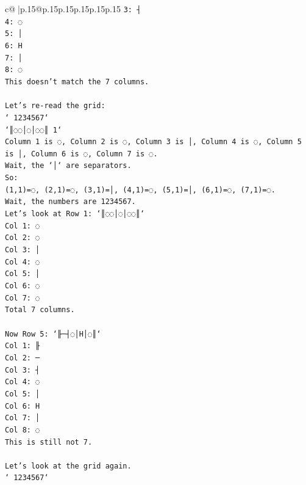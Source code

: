 \documentclass{article}
\begin{document}
{\begin{supertabular}{c@{$\;$}|p{.15\linewidth}@{}p{.15\linewidth}p{.15\linewidth}p{.15\linewidth}p{.15\linewidth}p{.15\linewidth}}
{{{\texttt{3: ┤} \\
\texttt{4: ◌} \\
\texttt{5: │} \\
\texttt{6: H} \\
\texttt{7: │} \\
\texttt{8: ◌} \\
\texttt{This doesn't match the 7 columns.} \\
\\ 
\texttt{Let's re{-}read the grid:} \\
\texttt{` 1234567`} \\
\texttt{`║◌◌│◌│◌◌║ 1`} \\
\texttt{Column 1 is ◌, Column 2 is ◌, Column 3 is │, Column 4 is ◌, Column 5 is │, Column 6 is ◌, Column 7 is ◌.} \\
\texttt{Wait, the `│` are separators.} \\
\texttt{So:} \\
\texttt{(1,1)=◌, (2,1)=◌, (3,1)=│, (4,1)=◌, (5,1)=│, (6,1)=◌, (7,1)=◌.} \\
\texttt{Wait, the numbers are 1234567.} \\
\texttt{Let's look at Row 1: `║◌◌│◌│◌◌║`} \\
\texttt{Col 1: ◌} \\
\texttt{Col 2: ◌} \\
\texttt{Col 3: │} \\
\texttt{Col 4: ◌} \\
\texttt{Col 5: │} \\
\texttt{Col 6: ◌} \\
\texttt{Col 7: ◌} \\
\texttt{Total 7 columns.} \\
\\ 
\texttt{Now Row 5: `╟─┤◌│H│◌║`} \\
\texttt{Col 1: ╟} \\
\texttt{Col 2: ─} \\
\texttt{Col 3: ┤} \\
\texttt{Col 4: ◌} \\
\texttt{Col 5: │} \\
\texttt{Col 6: H} \\
\texttt{Col 7: │} \\
\texttt{Col 8: ◌} \\
\texttt{This is still not 7.} \\
\\ 
\texttt{Let's look at the grid again.} \\
\texttt{` 1234567`} \\
}}}
\end{supertabular}}
\end{document}
